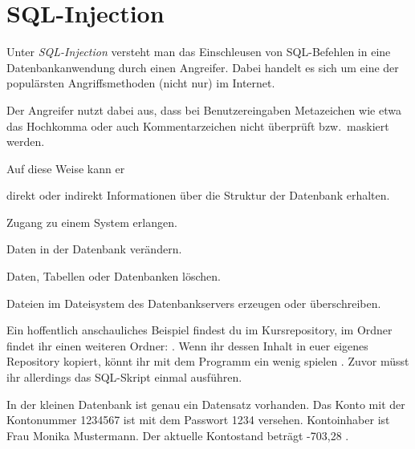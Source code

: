 \clearpage

\rehead[]{\textcolor{lightblue}{AvHG, Inf, My}}
\lohead[]{\textcolor{lightblue}{AvHG, Inf, My}}

\lstset{style=myJava}


\section{SQL-Injection}

Unter \emph{SQL-Injection} versteht man das Einschleusen von SQL-Befehlen
in eine Datenbankanwendung durch einen Angreifer. Dabei handelt es sich um eine
der populärsten Angriffsmethoden (nicht nur) im Internet.

Der Angreifer nutzt dabei aus, dass bei Benutzereingaben Metazeichen wie etwa
das Hochkomma oder auch Kommentarzeichen nicht überprüft bzw.\ maskiert werden.

Auf diese Weise kann er 

\begin{compactitem}
\item direkt oder indirekt Informationen über die Struktur der
Datenbank erhalten.
\item Zugang zu einem System erlangen.
\item Daten in der Datenbank verändern.
\item Daten, Tabellen oder Datenbanken löschen.
\item Dateien im Dateisystem des Datenbankservers erzeugen oder überschreiben.
\end{compactitem}

Ein hoffentlich anschauliches Beispiel findest du im Kursrepository, im Ordner
 findet ihr einen weiteren Ordner:
. Wenn ihr dessen Inhalt in euer eigenes Repository
kopiert, könnt ihr mit dem Programm  ein wenig \glqq spielen
\grqq . Zuvor müsst ihr allerdings das SQL-Skript 
einmal ausführen.

In der kleinen Datenbank ist genau ein Datensatz vorhanden. Das Konto mit der
Kontonummer 1234567 ist mit dem Passwort 1234 versehen. Kontoinhaber ist Frau
Monika Mustermann. Der aktuelle Kontostand beträgt -703,28 \texteuro .

